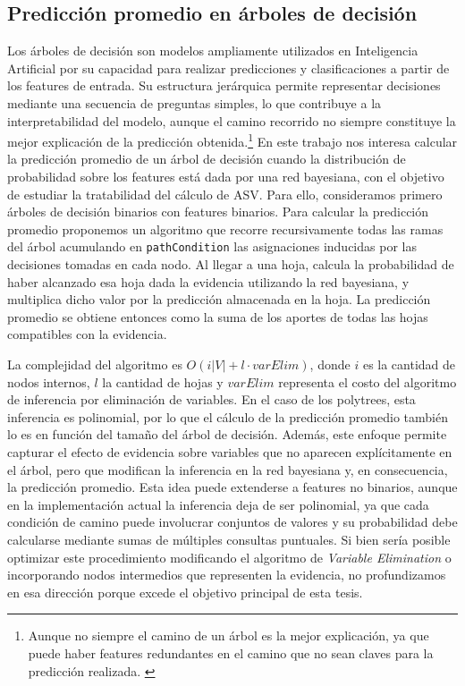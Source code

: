\subsection{Predicción promedio en árboles de decisión}

Los árboles de decisión son modelos ampliamente utilizados en Inteligencia Artificial por su capacidad para realizar predicciones y clasificaciones a partir de los features de entrada. Su estructura jerárquica permite representar decisiones mediante una secuencia de preguntas simples, lo que contribuye a la interpretabilidad del modelo, aunque el camino recorrido no siempre constituye la mejor explicación de la predicción obtenida.\footnote{Aunque no siempre el camino de un árbol es la mejor explicación, ya que puede haber features redundantes en el camino que no sean claves para la predicción realizada. \cite{audemard2021explanatorypowerdecisiontrees}} En este trabajo nos interesa calcular la predicción promedio de un árbol de decisión cuando la distribución de probabilidad sobre los features está dada por una red bayesiana, con el objetivo de estudiar la tratabilidad del cálculo de ASV. Para ello, consideramos primero árboles de decisión binarios con features binarios. Para calcular la predicción promedio proponemos un algoritmo que recorre recursivamente todas las ramas del árbol acumulando en \texttt{pathCondition} las asignaciones inducidas por las decisiones tomadas en cada nodo. Al llegar a una hoja, calcula la probabilidad de haber alcanzado esa hoja dada la evidencia utilizando la red bayesiana, y multiplica dicho valor por la predicción almacenada en la hoja. La predicción promedio se obtiene entonces como la suma de los aportes de todas las hojas compatibles con la evidencia.

La complejidad del algoritmo es $O(i|V| + l \cdot varElim)$, donde $i$ es la cantidad de nodos internos, $l$ la cantidad de hojas y $varElim$ representa el costo del algoritmo de inferencia por eliminación de variables. En el caso de los polytrees, esta inferencia es polinomial, por lo que el cálculo de la predicción promedio también lo es en función del tamaño del árbol de decisión. Además, este enfoque permite capturar el efecto de evidencia sobre variables que no aparecen explícitamente en el árbol, pero que modifican la inferencia en la red bayesiana y, en consecuencia, la predicción promedio. Esta idea puede extenderse a features no binarios, aunque en la implementación actual la inferencia deja de ser polinomial, ya que cada condición de camino puede involucrar conjuntos de valores y su probabilidad debe calcularse mediante sumas de múltiples consultas puntuales. Si bien sería posible optimizar este procedimiento modificando el algoritmo de \textit{Variable Elimination} o incorporando nodos intermedios que representen la evidencia, no profundizamos en esa dirección porque excede el objetivo principal de esta tesis.